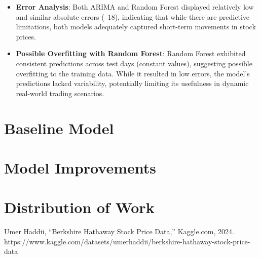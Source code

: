 \documentclass[conference]{IEEEtran}
\begin{document}
\begin{itemize}
    \item \textbf{Error Analysis}: Both ARIMA and Random Forest displayed relatively low and similar absolute errors (~18), indicating that while there are predictive limitations, both models adequately captured short-term movements in stock prices.
    \item \textbf{Possible Overfitting with Random Forest}: Random Forest exhibited consistent predictions across test days (constant values), suggesting possible overfitting to the training data. While it resulted in low errors, the model’s predictions lacked variability, potentially limiting its usefulness in dynamic real-world trading scenarios.
\end{itemize}

\section{Baseline Model}

\section{Model Improvements}

\section{Distribution of Work}

\begin{thebibliography}{00}
 Umer Haddii, “Berkshire Hathaway Stock Price Data,” Kaggle.com, 2024. https://www.kaggle.com/datasets/umerhaddii/berkshire-hathaway-stock-price-data

\end{thebibliography}
\end{document}
